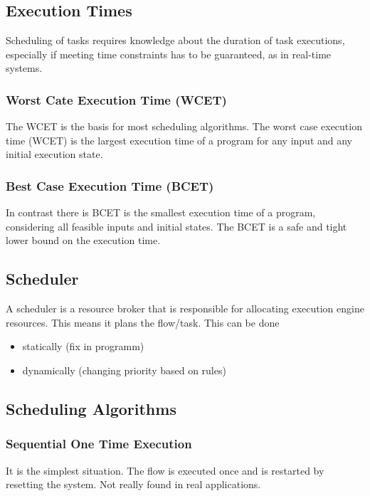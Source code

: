 \subsection{Execution Times}
Scheduling of tasks requires knowledge about the duration of task executions, especially if meeting time constraints has to be guaranteed, as in real-time systems.

\subsubsection[Worst Case Execution Time]{Worst Cate Execution Time (WCET)}
The WCET is the basis for most scheduling algorithms.
The worst case execution time (WCET) is the largest execution time of a program for any input and any initial execution state.

\subsubsection[Best Case Execution Time]{Best Case Execution Time (BCET)}
In contrast there is BCET is the smallest execution time of a program, considering all feasible inputs and initial states.
The BCET is a safe and tight lower bound on the execution time.

\subsection{Scheduler}
A scheduler is a resource broker that is responsible for allocating execution engine resources.
This means it plans the flow/task.
This can be done
\begin{itemize}
  \item statically (fix in programm)
  \item dynamically (changing priority based on rules)
\end{itemize}

\subsection{Scheduling Algorithms}

\subsubsection{Sequential One Time Execution}
\begin{paracol}{2}
  It is the simplest situation.
  The flow is executed once and is restarted by resetting the system.
  Not really found in real applications.
  \switchcolumn
  
\end{paracol}
